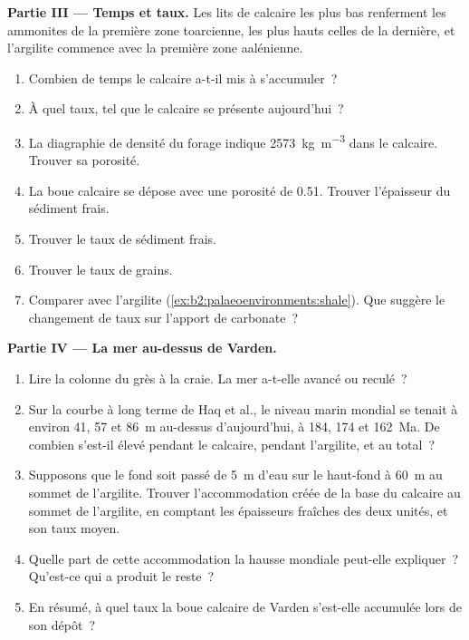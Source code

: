 \begin{problem}
\medskip\noindent\textbf{Partie III --- Temps et taux.} Les lits de calcaire les plus
bas renferment les ammonites de la première zone toarcienne, les plus hauts celles
de la dernière, et l'argilite commence avec la première zone aalénienne.
\begin{enumerate}[resume]
\item Combien de temps le calcaire a-t-il mis à s'accumuler~?
\item À quel taux, tel que le calcaire se présente aujourd'hui~?
\item La diagraphie de densité du forage indique
\qty{2573}{kg.m^{-3}} dans le calcaire. Trouver sa porosité.
\item La boue calcaire se dépose avec une porosité de 0.51. Trouver l'épaisseur du sédiment frais.
\item Trouver le taux de sédiment frais.
\item Trouver le taux de grains.
\item Comparer avec l'argilite (\cref{ex:b2:palaeoenvironments:shale}).
Que suggère le changement de taux sur l'apport de carbonate~?
\end{enumerate}

\medskip\noindent\textbf{Partie IV --- La mer au-dessus de Varden.}
\begin{enumerate}[resume]
\item Lire la colonne du grès à la craie. La mer a-t-elle avancé ou reculé~?
\item Sur la courbe à long terme de Haq et al., le niveau marin mondial se tenait à
environ 41, 57 et \qty{86}{m} au-dessus d'aujourd'hui, à 184, 174 et \qty{162}{Ma}. De
combien s'est-il élevé pendant le calcaire, pendant l'argilite, et au total~?
\item Supposons que le fond soit passé de \qty{5}{m} d'eau sur le haut-fond à \qty{60}{m} au
sommet de l'argilite. Trouver l'accommodation créée de la base du calcaire au sommet
de l'argilite, en comptant les épaisseurs fraîches des deux unités, et son taux moyen.
\item Quelle part de cette accommodation la hausse mondiale peut-elle expliquer~? Qu'est-ce qui a produit le reste~?
\item En résumé, à quel taux la boue calcaire de
Varden s'est-elle accumulée lors de son dépôt~?
\end{enumerate}
\end{problem}
